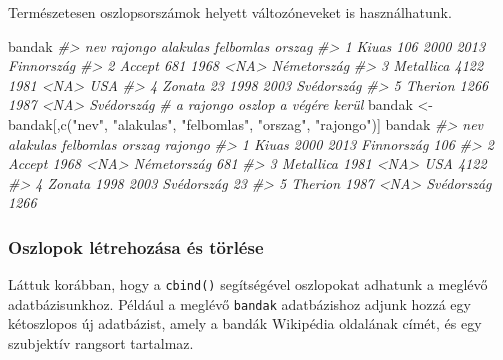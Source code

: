 \documentclass[
]{book}
\newenvironment{Shaded}{\begin{snugshade}}{\end{snugshade}}
\newcommand{\CommentTok}[1]{\textcolor[rgb]{0.56,0.35,0.01}{\textit{#1}}}
\newcommand{\FunctionTok}[1]{\textcolor[rgb]{0.00,0.00,0.00}{#1}}
\newcommand{\NormalTok}[1]{#1}
\newcommand{\OtherTok}[1]{\textcolor[rgb]{0.56,0.35,0.01}{#1}}
\newcommand{\StringTok}[1]{\textcolor[rgb]{0.31,0.60,0.02}{#1}}
\begin{document}
Természetesen oszlopsorszámok helyett változóneveket is használhatunk.

\begin{Shaded}
\begin{Highlighting}[]
\NormalTok{bandak}
\CommentTok{\#\textgreater{}         nev rajongo alakulas felbomlas      orszag}
\CommentTok{\#\textgreater{} 1     Kiuas     106     2000      2013  Finnország}
\CommentTok{\#\textgreater{} 2    Accept     681     1968      \textless{}NA\textgreater{} Németország}
\CommentTok{\#\textgreater{} 3 Metallica    4122     1981      \textless{}NA\textgreater{}         USA}
\CommentTok{\#\textgreater{} 4    Zonata      23     1998      2003  Svédország}
\CommentTok{\#\textgreater{} 5   Therion    1266     1987      \textless{}NA\textgreater{}  Svédország}
\CommentTok{\# a rajongo oszlop a végére kerül}
\NormalTok{bandak }\OtherTok{\textless{}{-}}\NormalTok{ bandak[,}\FunctionTok{c}\NormalTok{(}\StringTok{"nev"}\NormalTok{, }\StringTok{"alakulas"}\NormalTok{, }\StringTok{"felbomlas"}\NormalTok{, }\StringTok{"orszag"}\NormalTok{, }\StringTok{"rajongo"}\NormalTok{)]}
\NormalTok{bandak}
\CommentTok{\#\textgreater{}         nev alakulas felbomlas      orszag rajongo}
\CommentTok{\#\textgreater{} 1     Kiuas     2000      2013  Finnország     106}
\CommentTok{\#\textgreater{} 2    Accept     1968      \textless{}NA\textgreater{} Németország     681}
\CommentTok{\#\textgreater{} 3 Metallica     1981      \textless{}NA\textgreater{}         USA    4122}
\CommentTok{\#\textgreater{} 4    Zonata     1998      2003  Svédország      23}
\CommentTok{\#\textgreater{} 5   Therion     1987      \textless{}NA\textgreater{}  Svédország    1266}
\end{Highlighting}
\end{Shaded}

\hypertarget{oszlopok-luxe9trehozuxe1sa-uxe9s-tuxf6rluxe9se}{%
\subsubsection{Oszlopok létrehozása és törlése}\label{oszlopok-luxe9trehozuxe1sa-uxe9s-tuxf6rluxe9se}}

Láttuk korábban, hogy a \texttt{cbind()} segítségével oszlopokat adhatunk a meglévő adatbázisunkhoz. Például a meglévő \texttt{bandak} adatbázishoz adjunk hozzá egy kétoszlopos új adatbázist, amely a bandák Wikipédia oldalának címét, és egy szubjektív rangsort tartalmaz.
\end{document}
